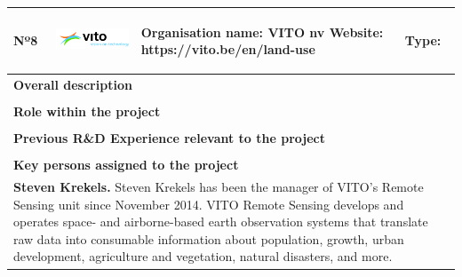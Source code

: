 \begin{longtable}[H]{|p{0.7cm}|p{4cm}|p{7cm}|p{1.3cm}|}
	\hline
	\begin{center} Nº8 \end{center} & \begin{center} \includegraphics[scale=0.35]{./logos/vito-logo} \end{center} & \begin{center} \textbf{Organisation name:} VITO nv \newline \textbf{Website:} https://vito.be/en/land-use \end{center} & \begin{center} Type: \end{center} \\ \hline
	
	\multicolumn{4}{|p{13cm}|}{\textbf{Overall description}}  \\ \hline
	
	\multicolumn{4}{|p{14.5cm}|}{}  \\ \hline
	
	\multicolumn{4}{|p{13cm}|}{\textbf{Role within the project}}   \\ \hline
	
	\multicolumn{4}{|p{14.5cm}|}{}  \\ \hline
	
	\multicolumn{4}{|p{13cm}|}{\textbf{Previous R\&D Experience relevant to the project}}  \\ \hline
	
	\multicolumn{4}{|p{14.5cm}|}{}  \\ \hline
	
	\multicolumn{4}{|p{13cm}|}{\textbf{Key persons assigned to the project}}   \\ \hline
	
	\multicolumn{4}{|p{14.5cm}|}{\textbf{Steven Krekels.} Steven Krekels has been the manager of VITO’s Remote Sensing unit since November 2014. VITO Remote Sensing develops and operates space- and airborne-based earth observation systems that translate raw data into consumable information about population, growth, urban development, agriculture and vegetation, natural disasters, and more.}  \\ \hline
	

\end{longtable}
